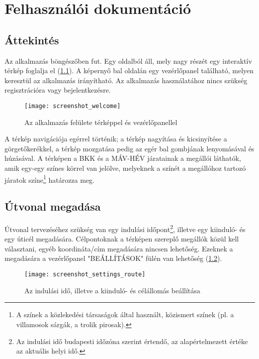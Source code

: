 \chapter{Felhasználói dokumentáció}
\label{ch:user}

\section{Áttekintés}

Az alkalmazás böngészőben fut. Egy oldalból áll, mely nagy részét egy interaktív térkép foglalja el (\ref{fig:screenshot-welcome}). A képernyő bal oldalán egy vezérlőpanel található, melyen keresztül az alkalmazás irányítható. Az alkalmazás használatához nincs szükség regisztrációra vagy bejelentkezésre.

\begin{figure}[H]
	\centering
	\texttt{[image: screenshot\_welcome]}
	\caption{Az alkalmazás felülete térképpel és vezérlőpanellel}
	\label{fig:screenshot-welcome}
\end{figure}

A térkép navigációja egérrel történik; a térkép nagyítása és kicsinyítése a görgetőkerékkel, a térkép mozgatása pedig az egér bal gombjának lenyomásával és húzásával. A térképen a BKK és a MÁV-HÉV járatainak a megállói láthatók, amik egy-egy színes körrel van jelölve, melyeknek a színét a megállóhoz tartozó járatok színe\footnote{A színek a közlekedési társaságok által használt, közismert színek (pl. a villamosok sárgák, a trolik pirosak).} határozza meg.

\section{Útvonal megadása}

Útvonal tervezéséhez szükség van egy indulási időpont\footnote{Az indulási idő budapesti időzóna szerint értendő, az alapértelmezett értéke az aktuális helyi idő.}, illetve egy kiinduló- és egy úticél megadására. Célpontoknak a térképen szereplő megállók közül kell választani, egyéb koordináta/cím megadására nincsen lehetőség. Ezeknek a megadására a vezérlőpanel "BEÁLLÍTÁSOK" fülén van lehetőség (\ref{fig:screenshot-settings-route}).

\begin{figure}[H]
	\centering
	\texttt{[image: screenshot\_settings\_route]}
	\caption{Az indulási idő, illetve a kiinduló- és célállomás beállítása}
	\label{fig:screenshot-settings-route}
\end{figure}

